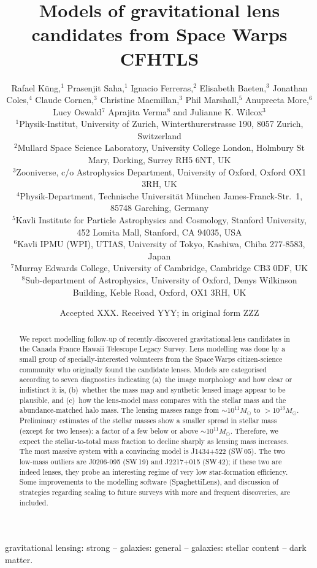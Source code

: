 \documentclass[fleqn,usenatbib]{template/mnras}
\title[Lens models for Space Warps CFHTLS]{Models of gravitational lens candidates from
  Space Warps CFHTLS}
\author[K\"ung et al]{Rafael K\"ung,$^{1}$
Prasenjit Saha,$^{1}$
Ignacio Ferreras,$^{2}$
Elisabeth Baeten,$^{3}$
\newauthor
Jonathan Coles,$^{4}$
Claude Cornen,$^{3}$
Christine Macmillan,$^{3}$
Phil Marshall,$^{5}$ 
\newauthor
Anupreeta More,$^{6}$
Lucy Oswald$^{7}$
Aprajita Verma$^{8}$
and Julianne K. Wilcox$^{3}$
%
\\
%
$^{1}$Physik-Institut, University of Zurich, Winterthurerstrasse 190, 8057 Zurich, Switzerland\\
$^{2}$Mullard Space Science Laboratory, University College London, Holmbury St Mary, Dorking, Surrey RH5 6NT, UK\\
$^{3}$Zooniverse, c/o Astrophysics Department, University of Oxford, Oxford OX1 3RH, UK \\
$^{4}$Physik-Department, Technische Universit\"at M\"unchen
James-Franck-Str.~1, 85748 Garching, Germany\\
$^{5}$Kavli Institute for Particle Astrophysics and Cosmology, Stanford University, 452 Lomita Mall, Stanford, CA 94035, USA\\
$^{6}$Kavli IPMU (WPI), UTIAS, University of Tokyo, Kashiwa, Chiba 277-8583, Japan\\
$^{7}$Murray Edwards College, University of Cambridge, Cambridge CB3 0DF, UK\\
$^{8}$Sub-department of Astrophysics, University of Oxford, Denys Wilkinson Building, Keble Road, Oxford, OX1 3RH, UK\\
}
\date{Accepted XXX. Received YYY; in original form ZZZ}
\newcommand{\SW}{Space\,Warps\xspace}
\newcommand{\sw}[1]{SW\,#1\xspace}
\begin{document}
\label{firstpage}
\pagerange{\pageref{firstpage}--\pageref{lastpage}}
\maketitle

\begin{abstract}
We report modelling follow-up of recently-discovered
gravitational-lens candidates in the Canada France Hawaii Telescope
Legacy Survey. Lens modelling was done by a small group of
specially-interested volunteers from the \SW citizen-science community
who originally found the candidate lenses.  Models are categorised
according to seven diagnostics indicating (a)~the image morphology and
how clear or indistinct it is, (b)~whether the mass map and synthetic
lensed image appear to be plausible, and (c)~how the lens-model mass
compares with the stellar mass and the abundance-matched halo mass.
The lensing masses range from $\sim10^{11}M_\odot$ to
$>10^{13}M_\odot$. Preliminary estimates of the stellar masses show a
smaller spread in stellar mass (except for two lenses): a factor of a
few below or above $\sim10^{11}M_\odot$.  Therefore, we expect the
stellar-to-total mass fraction to decline sharply as lensing mass
increases.  The most massive system with a convincing model is
J1434+522 (\sw{05}).  The two low-mass outliers are J0206-095
(\sw{19}) and J2217+015 (\sw{42}); if these two are indeed lenses,
they probe an interesting regime of very low star-formation
efficiency.  Some improvements to the modelling software
(SpaghettiLens), and discussion of strategies regarding scaling to
future surveys with more and frequent discoveries, are included.
\end{abstract}

\begin{keywords}
gravitational lensing: strong -- galaxies: general
-- galaxies: stellar content -- dark matter.
\end{keywords}














\end{document}

